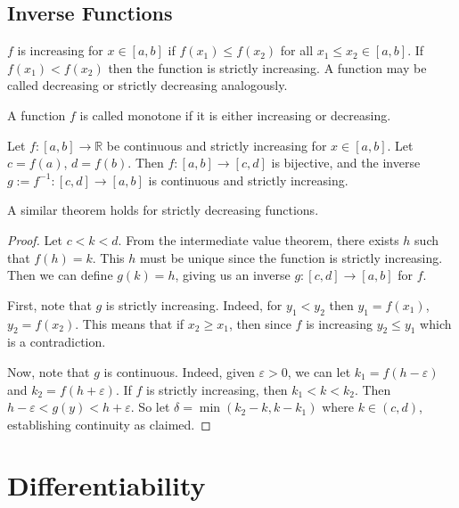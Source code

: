\documentclass{article}
\begin{document}
\subsection{Inverse Functions}
\begin{definition}
	$f$ is increasing for $x \in [a, b]$ if $f(x_1) \leq f(x_2)$ for all $x_1 \leq x_2 \in [a, b]$. If $f(x_1) < f(x_2)$ then the function is strictly increasing. A function may be called decreasing or strictly decreasing analogously.
\end{definition}
\begin{definition}
	A function $f$ is called monotone if it is either increasing or decreasing.
\end{definition}
\begin{theorem}
	Let $f \colon [a, b] \to \mathbb R$ be continuous and strictly increasing for $x \in [a, b]$. Let $c = f(a)$, $d = f(b)$. Then $f \colon [a, b] \to [c, d]$ is bijective, and the inverse $g := f^{-1} \colon [c, d] \to [a, b]$ is continuous and strictly increasing.
\end{theorem}
\noindent A similar theorem holds for strictly decreasing functions.
\begin{proof}
	Let $c < k < d$. From the intermediate value theorem, there exists $h$ such that $f(h) = k$. This $h$ must be unique since the function is strictly increasing. Then we can define $g(k) = h$, giving us an inverse $g \colon [c, d] \to [a, b]$ for $f$.

	First, note that $g$ is strictly increasing. Indeed, for $y_1 < y_2$ then $y_1 = f(x_1)$, $y_2 = f(x_2)$. This means that if $x_2 \geq x_1$, then since $f$ is increasing $y_2 \leq y_1$ which is a contradiction.

	Now, note that $g$ is continuous. Indeed, given $\varepsilon > 0$, we can let $k_1 = f(h - \varepsilon)$ and $k_2 = f(h + \varepsilon)$. If $f$ is strictly increasing, then $k_1 < k < k_2$. Then $h - \varepsilon < g(y) < h + \varepsilon$. So let $\delta = \min(k_2 - k, k - k_1)$ where $k \in (c, d)$, establishing continuity as claimed.
\end{proof}

\section{Differentiability}
\end{document}
